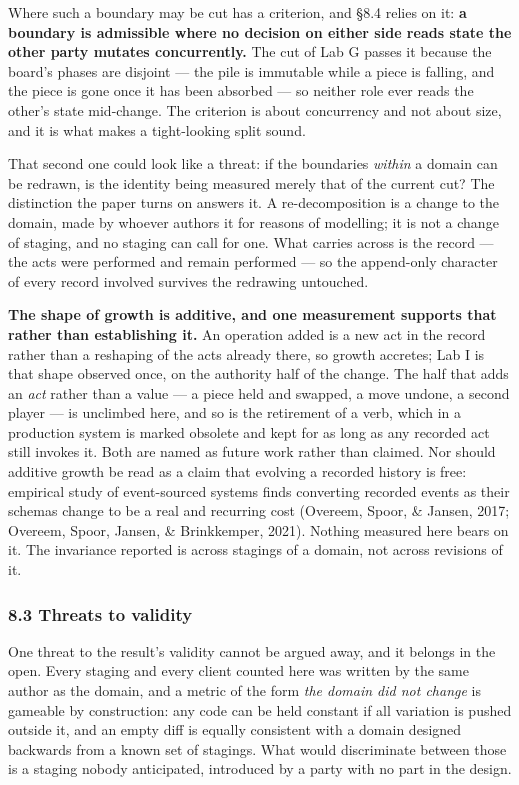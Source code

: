 \documentclass[
]{article}
\begin{document}
Where such a boundary may be cut has a criterion, and §8.4 relies on it:
\textbf{a boundary is admissible where no decision on either side reads
state the other party mutates concurrently.} The cut of Lab G passes it
because the board's phases are disjoint --- the pile is immutable while
a piece is falling, and the piece is gone once it has been absorbed ---
so neither role ever reads the other's state mid-change. The criterion
is about concurrency and not about size, and it is what makes a
tight-looking split sound.

That second one could look like a threat: if the boundaries
\emph{within} a domain can be redrawn, is the identity being measured
merely that of the current cut? The distinction the paper turns on
answers it. A re-decomposition is a change to the domain, made by
whoever authors it for reasons of modelling; it is not a change of
staging, and no staging can call for one. What carries across is the
record --- the acts were performed and remain performed --- so the
append-only character of every record involved survives the redrawing
untouched.

\textbf{The shape of growth is additive, and one measurement supports
that rather than establishing it.} An operation added is a new act in
the record rather than a reshaping of the acts already there, so growth
accretes; Lab I is that shape observed once, on the authority half of
the change. The half that adds an \emph{act} rather than a value --- a
piece held and swapped, a move undone, a second player --- is unclimbed
here, and so is the retirement of a verb, which in a production system
is marked obsolete and kept for as long as any recorded act still
invokes it. Both are named as future work rather than claimed. Nor
should additive growth be read as a claim that evolving a recorded
history is free: empirical study of event-sourced systems finds
converting recorded events as their schemas change to be a real and
recurring cost (Overeem, Spoor, \& Jansen, 2017; Overeem, Spoor, Jansen,
\& Brinkkemper, 2021). Nothing measured here bears on it. The invariance
reported is across stagings of a domain, not across revisions of it.

\subsubsection{8.3 Threats to validity}\label{threats-to-validity}

One threat to the result's validity cannot be argued away, and it
belongs in the open. Every staging and every client counted here was
written by the same author as the domain, and a metric of the form
\emph{the domain did not change} is gameable by construction: any code
can be held constant if all variation is pushed outside it, and an empty
diff is equally consistent with a domain designed backwards from a known
set of stagings. What would discriminate between those is a staging
nobody anticipated, introduced by a party with no part in the design.
\end{document}
